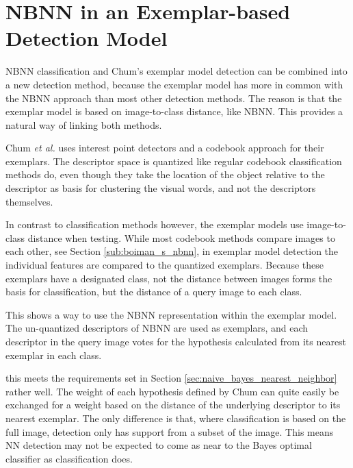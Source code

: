 
\chapter{NBNN in an Exemplar-based Detection Model} %
\label{sec:linking}

NBNN classification and Chum's exemplar model detection can be combined into a new detection method, because the exemplar model has more in common with the NBNN approach than most other detection methods. The reason is that the exemplar model is based on image-to-class distance, like NBNN. This provides a natural way of linking both methods.

Chum \emph{et al.}\cite{chum2007exemplar} uses interest point detectors and a codebook approach for their exemplars. The descriptor space is quantized like regular codebook classification methods do, even though they take the location of the object relative to the descriptor as basis for clustering the visual words, and not the descriptors themselves.

In contrast to classification methods however, the exemplar models use image-to-class distance when testing. While most codebook methods  compare images to each other, see Section \ref{sub:boiman_s_nbnn}, in exemplar model detection the individual features are compared to the quantized exemplars. Because these exemplars have a designated class, not the distance between images forms the basis for classification, but the distance of a query image to each class.

This shows a way to use the NBNN representation within the exemplar model. The un-quantized descriptors of NBNN are used as exemplars, and each descriptor in the query image votes for the hypothesis calculated from its nearest exemplar in each class. 



this meets the requirements set in Section \ref{sec:naive_bayes_nearest_neighbor} rather well. The weight of each hypothesis defined by Chum can quite easily be exchanged for a weight based on the distance of the underlying descriptor to its nearest exemplar. The only difference is that, where classification is based on the full image, detection only has support from a subset of the image. This means NN detection may not be expected to come as near to the Bayes optimal classifier as classification does.


